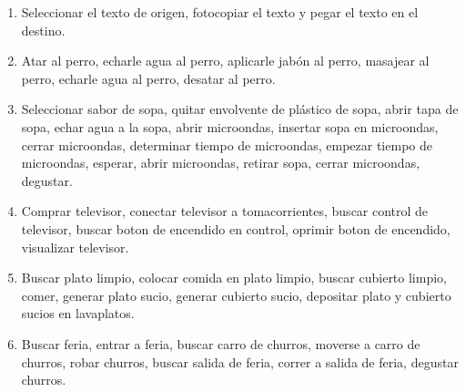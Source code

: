 \documentclass[10pt,a4paper]{article}
\begin{document}
	\begin{enumerate}
            \item{Seleccionar el texto de origen, fotocopiar el texto 	y pegar el texto en el destino.}
            \item{Atar al perro, echarle agua al perro, aplicarle jabón al perro, masajear al perro, echarle agua al perro, desatar al perro.}
            \item{Seleccionar sabor de sopa, quitar envolvente de plástico de sopa, abrir tapa de sopa, echar agua a la sopa, abrir microondas, insertar sopa en microondas, cerrar microondas, determinar tiempo de microondas, empezar tiempo de microondas, esperar, abrir microondas, retirar sopa, cerrar microondas, degustar.}
            \item{Comprar televisor, conectar televisor a tomacorrientes, buscar control de televisor, buscar boton de encendido en control, oprimir boton de encendido, visualizar televisor.}
            \item{Buscar plato limpio, colocar comida en plato limpio, buscar cubierto limpio, comer, generar plato sucio, generar cubierto sucio, depositar plato y cubierto sucios en lavaplatos.}
            \item{Buscar feria, entrar a feria, buscar carro de churros, moverse a carro de churros, robar churros, buscar salida de feria, correr a salida de feria, degustar churros.}
    \end{enumerate}
	
\end{document}
